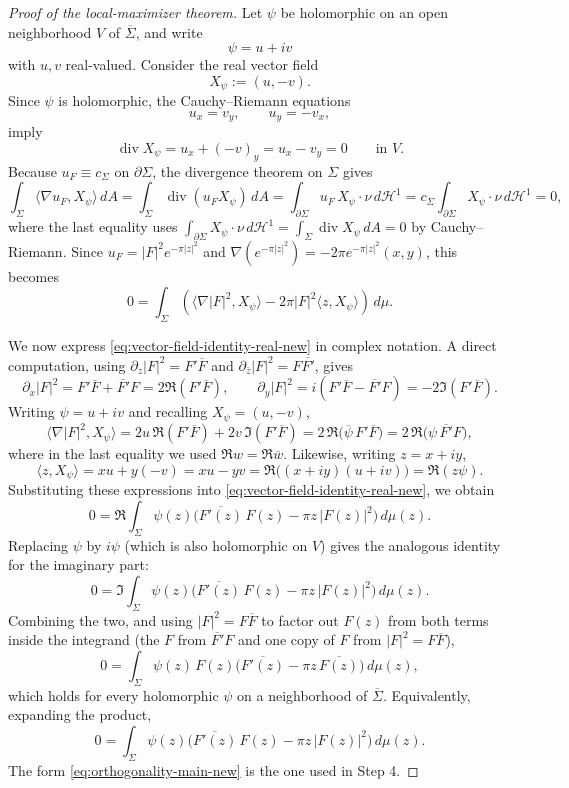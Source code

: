 \begin{proof}[Proof of the local-maximizer theorem]
Let \(\psi\) be holomorphic on an open neighborhood \(V\) of
\(\overline \Sigma\), and write
\[
\psi=u+iv
\]
with \(u,v\) real-valued. Consider the real vector field
\[
X_\psi:=(u,-v).
\]
Since \(\psi\) is holomorphic, the Cauchy--Riemann equations
\[
u_x=v_y,
\qquad
u_y=-v_x,
\]
imply
\[
\operatorname{div}X_\psi=u_x+(-v)_y=u_x-v_y=0
\qquad \text{in }V.
\]
Because \(u_F\equiv c_\Sigma\) on \(\partial\Sigma\), the divergence theorem on
\(\Sigma\) gives
\[
\int_\Sigma \langle \nabla u_F, X_\psi\rangle\,dA
=
\int_\Sigma \operatorname{div}(u_F X_\psi)\,dA
=
\int_{\partial \Sigma} u_F\, X_\psi\cdot \nu\, d\mathcal H^1
=
c_\Sigma\int_{\partial \Sigma} X_\psi\cdot \nu\, d\mathcal H^1
=
0,
\]
where the last equality uses
\(\int_{\partial\Sigma}X_\psi\cdot\nu\,d\mathcal H^1
=\int_\Sigma\operatorname{div}X_\psi\,dA=0\) by Cauchy--Riemann. Since
\(u_F=|F|^2e^{-\pi |z|^2}\) and
\(\nabla(e^{-\pi|z|^2})=-2\pi e^{-\pi|z|^2}(x,y)\), this becomes
\begin{equation}\label{eq:vector-field-identity-real-new}
0=
\int_\Sigma
\left(
\langle \nabla |F|^2,X_\psi\rangle
-
2\pi |F|^2 \langle z,X_\psi\rangle
\right)
\,d\mu.
\end{equation}

We now express \eqref{eq:vector-field-identity-real-new} in complex notation.
A direct computation, using \(\partial_z|F|^2=F'\overline F\) and
\(\partial_{\bar z}|F|^2=F\overline{F'}\), gives
\[
\partial_x |F|^2 = F'\overline F+\overline{F'}F = 2\Re(F'\overline F),
\qquad
\partial_y |F|^2 = i(F'\overline F-\overline{F'}F) = -2\Im(F'\overline F).
\]
Writing \(\psi=u+iv\) and recalling \(X_\psi=(u,-v)\),
\[
\langle \nabla |F|^2,X_\psi\rangle
=
2u\,\Re(F'\overline F)+2v\,\Im(F'\overline F)
=
2\,\Re\!\big(\overline{\psi}\,F'\overline F\big)
=
2\,\Re\!\big(\psi\,\overline{F'}F\big),
\]
where in the last equality we used \(\Re w=\Re\overline w\). Likewise, writing
\(z=x+iy\),
\[
\langle z,X_\psi\rangle
=
xu+y(-v)
=
xu-yv
=
\Re\big((x+iy)(u+iv)\big)
=
\Re(z\psi).
\]
Substituting these expressions into
\eqref{eq:vector-field-identity-real-new}, we obtain
\[
0=
\Re\!\int_\Sigma
\psi(z)\Big(\overline{F'(z)}\,F(z)-\pi z\,|F(z)|^2\Big)\,d\mu(z).
\]
Replacing \(\psi\) by \(i\psi\) (which is also holomorphic on \(V\)) gives the
analogous identity for the imaginary part:
\[
0=
\Im\!\int_\Sigma
\psi(z)\Big(\overline{F'(z)}\,F(z)-\pi z\,|F(z)|^2\Big)\,d\mu(z).
\]
Combining the two, and using \(|F|^2=F\overline F\) to factor out \(F(z)\)
from both terms inside the integrand (the \(F\) from \(\overline{F'}F\) and
one copy of \(F\) from \(|F|^2=F\overline F\)),
\begin{equation}\label{eq:orthogonality-main-new}
0=
\int_\Sigma
\psi(z)\,F(z)\Big(\overline{F'(z)}-\pi z\,\overline{F(z)}\Big)\,d\mu(z),
\end{equation}
which holds for every holomorphic \(\psi\) on a neighborhood of
\(\overline \Sigma\). Equivalently, expanding the product,
\begin{equation*}
0=
\int_\Sigma
\psi(z)\Big(\overline{F'(z)}\,F(z)-\pi z\,|F(z)|^2\Big)\,d\mu(z).
\end{equation*}
The form \eqref{eq:orthogonality-main-new} is the one used in Step 4.


\end{proof}
